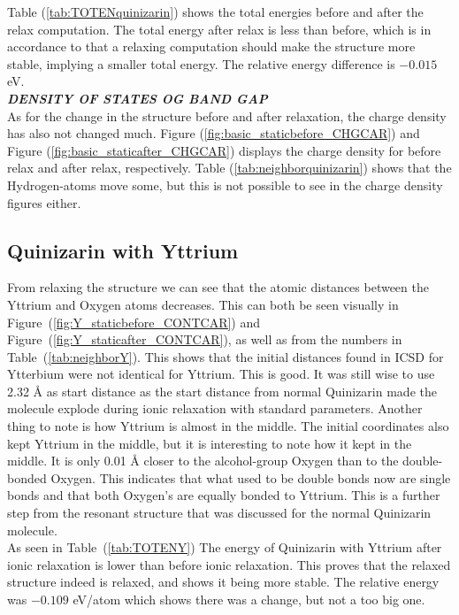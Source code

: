 \documentclass{article}
\begin{document}
    Table (\ref{tab:TOTENquinizarin}) shows the total energies before and after the relax computation. The total energy after relax is less than before, which is in accordance to that a relaxing computation should make the structure more stable, implying a smaller total energy. The relative energy difference is $-0.015$ eV. \\

    \textbf{\textit{DENSITY OF STATES OG BAND GAP}} \\

    As for the change in the structure before and after relaxation, the charge density has also not changed much. Figure (\ref{fig:basic_staticbefore_CHGCAR}) and Figure (\ref{fig:basic_staticafter_CHGCAR}) displays the charge density for before relax and after relax, respectively. Table (\ref{tab:neighborquinizarin}) shows that the Hydrogen-atoms move some, but this is not possible to see in the charge density figures either.



  \subsection{Quinizarin with Yttrium}

    From relaxing the structure we can see that the atomic distances between the Yttrium and Oxygen atoms decreases. This can both be seen visually in Figure~(\ref{fig:Y_staticbefore_CONTCAR}) and Figure~(\ref{fig:Y_staticafter_CONTCAR}), as well as from the numbers in Table~(\ref{tab:neighborY}). This shows that the initial distances found in ICSD for Ytterbium were not identical for Yttrium. This is good. It was still wise to use 2.32 Å as start distance as the start distance from normal Quinizarin made the molecule explode during ionic relaxation with standard parameters. Another thing to note is how Yttrium is almost in the middle. The initial coordinates also kept Yttrium in the middle, but it is interesting to note how it kept in the middle. It is only 0.01 Å closer to the alcohol-group Oxygen than to the double-bonded Oxygen. This indicates that what used to be double bonds now are single bonds and that both Oxygen's are equally bonded to Yttrium. This is a further step from the resonant structure that was discussed for the normal Quinizarin molecule. \\

    As seen in Table~(\ref{tab:TOTENY}) The energy of Quinizarin with Yttrium after ionic relaxation is lower than before ionic relaxation. This proves that the relaxed structure indeed is relaxed, and shows it being more stable. The relative energy was $-0.109$ eV/atom which shows there was a change, but not a too big one. \\
\end{document}
